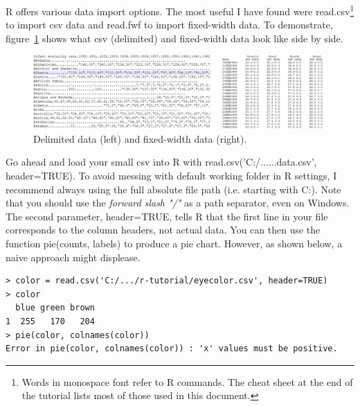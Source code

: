 \documentclass{report}
\newcommand{\code}[1]{\textsf{\ttfamily #1}}
\begin{document}
R offers various data import options. The most useful I have found were \code{read.csv}\footnote{Words in monospace font refer to R commands. The cheat sheet at the end of the tutorial lists most of those used in this document.} to import csv data and \code{read.fwf} to import fixed-width data. To demonstrate, figure~\ref{fig:data} shows what csv (delimited) and fixed-width data look like side by side.
\begin{figure}[h]
	\centering
	\includegraphics[width=1.0\textwidth]{data.png}
	\caption{Delimited data (left) and fixed-width data (right).}
	\label{fig:data}
\end{figure}

Go ahead and load your small csv into R with \code{read.csv('C:/......data.csv', header=TRUE)}. To avoid messing with default working folder in R settings, I recommend always using the full absolute file path (i.e. starting with C:). Note that you should use the \emph{forward slash "/"} as a path separator, even on Windows. The second parameter, \code{header=TRUE}, tells R that the first line in your file corresponds to the column headers, not actual data. You can then use the function \code{pie(counts, labels)} to produce a pie chart. However, as shown below, a naive approach might displease.
\begin{verbatim}
> color = read.csv('C:/.../r-tutorial/eyecolor.csv', header=TRUE)
> color
  blue green brown
1  255   170   204
> pie(color, colnames(color))
Error in pie(color, colnames(color)) : 'x' values must be positive.
\end{verbatim}
\end{document}
